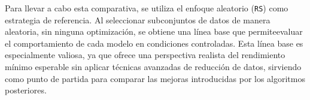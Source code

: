 Para llevar a cabo esta comparativa, se utiliza el enfoque aleatorio (\texttt{RS}) como estrategia de referencia.
Al seleccionar subconjuntos de datos de manera aleatoria, sin ninguna optimización, se obtiene una línea base que permiteevaluar el
comportamiento de cada modelo en condiciones controladas.
Esta línea base es especialmente valiosa, ya que ofrece una perspectiva realista del rendimiento mínimo esperable sin aplicar técnicas
avanzadas de reducción de datos, sirviendo como punto de partida para comparar las mejoras introducidas por los algoritmos posteriores.


\begin{table}[htp]
    \centering
\end{table}
